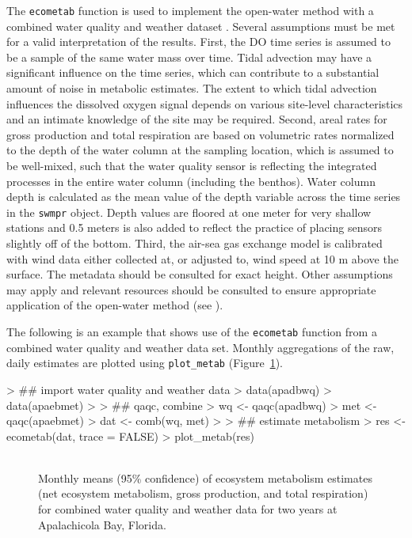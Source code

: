 The \texttt{ecometab} function is used to implement the open-water method with a combined water quality and weather dataset \cite{Caffrey14}.  Several assumptions must be met for a valid interpretation of the results.  First, the DO time series is assumed to be a sample of the same water mass over time.  Tidal advection may have a significant influence on the time series, which can contribute to a substantial amount of noise in metabolic estimates.  The extent to which tidal advection influences the dissolved oxygen signal depends on various site-level characteristics and an intimate knowledge of the site may be required.  Second, areal rates for gross production and total respiration are based on volumetric rates normalized to the depth of the water column at the sampling location, which is assumed to be well-mixed, such that the water quality sensor is reflecting the integrated processes in the entire water column (including the benthos).  Water column depth is calculated as the mean value of the depth variable across the time series in the \texttt{swmpr} object. Depth values are floored at one meter for very shallow stations and 0.5 meters is also added to reflect the practice of placing sensors slightly off of the bottom.  Third, the air-sea gas exchange model is calibrated with wind data either collected at, or adjusted to, wind speed at 10 m above the surface.  The metadata should be consulted for exact height. Other assumptions may apply and relevant resources should be consulted to ensure appropriate application of the open-water method (see \cite{Kemp12,Needoba12}).

The following is an example that shows use of the \texttt{ecometab} function from a combined water quality and weather data set.  Monthly aggregations of the raw, daily estimates are plotted using \texttt{plot\_metab} (Figure~\ref{fig:metab_ex}).

\begin{example}
> ## import water quality and weather data
> data(apadbwq)
> data(apaebmet)
> 
> ## qaqc, combine
> wq <- qaqc(apadbwq)
> met <- qaqc(apaebmet)
> dat <- comb(wq, met)
> 
> ## estimate metabolism
> res <- ecometab(dat, trace = FALSE)
> plot_metab(res)
\end{example}

\begin{figure}[!h]

{\centering \includegraphics[width=0.00\textwidth]{figure/metab_ex-1} 

}

\caption[Monthly means (95\% confidence) of ecosystem metabolism estimates (net ecosystem metabolism, gross production, and total respiration) for combined water quality and weather data for two years at Apalachicola Bay, Florida]{Monthly means (95\% confidence) of ecosystem metabolism estimates (net ecosystem metabolism, gross production, and total respiration) for combined water quality and weather data for two years at Apalachicola Bay, Florida.}\label{fig:metab_ex}
\end{figure}


